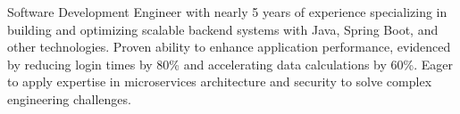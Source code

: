\documentclass[10pt,a4paper,ragged2e, normalphoto]{altacv}
\begin{document}

\begin{fullwidth}
\makecvheader
\smallskip
Software Development Engineer with nearly 5 years of experience specializing in building and optimizing scalable backend systems with Java, Spring Boot, and other technologies. Proven ability to enhance application performance, evidenced by reducing login times by 80\% and accelerating data calculations by 60\%. Eager to apply expertise in microservices architecture and security to solve complex engineering challenges.\newline
\end{fullwidth}



\end{document}
